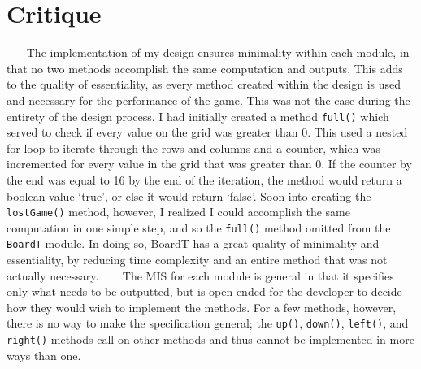 \documentclass[12pt]{article}
\begin{document}
\section* {Critique}
$~~$$~~$$~~$$~~$The implementation of my design ensures minimality within each module, in that no two methods accomplish the same computation and outputs. This adds to the quality of essentiality, as every method created within the design is used and necessary for the performance of the game. This was not the case during the entirety of the design process. I had initially created a method \verb|full()| which served to check if every value on the grid was greater than 0. This used a nested for loop to iterate through the rows and columns and a counter, which was incremented for every value in the grid that was greater than 0. If the counter by the end was equal to 16 by the end of the iteration, the method would return a boolean value ‘true’, or else it would return ‘false’. Soon into creating the \verb|lostGame()| method, however, I realized I could accomplish the same computation in one simple step, and so the \verb|full()| method omitted from the \verb|BoardT| module. In doing so, BoardT has a great quality of minimality and essentiality, by reducing time complexity and an entire method that was not actually necessary. \newline
\newline
$~~$$~~$$~~$$~~$The MIS for each module is general in that it specifies only what needs to be outputted, but is open ended for the developer to decide how they would wish to implement the methods. For a few methods, however, there is no way to make the specification general; the \verb|up()|, \verb|down()|, \verb|left()|, and \verb|right()| methods call on other methods and thus cannot be implemented in more ways than one. \newline
\newline
\end{document}
